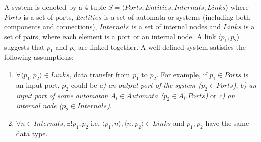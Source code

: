 A system is denoted by a 4-tuple
$S=\langle Ports, Entities, Internals, Links\rangle$ where $Ports$ is a set of ports, $Entities$ is a set of automata or systems (including both components and connections), $Internals$ is a set of internal nodes and $Links$ is a set of pairs, where each element is a port or an internal node. A link $\langle p_1,p_2\rangle$ suggests that $p_1$ and $p_2$ are linked together. A well-defined system satisfies the following assumptions:

\begin{enumerate}
    \item $\forall \langle p_1,p_2\rangle \in Links$, data transfer from $p_1$ to $p_2$. For example, if $p_1\in Ports$ is an input port, $p_2$ could be \emph{a) an output port of the system ($p_2\in Ports$)}, \emph{b) an input port of some automaton $A_i\in Automata$ ($p_2\in A_i.Ports$)} or \emph{c) an internal node ($p_2\in Internals$)}.
    \item $\forall n\in Internals,\exists!p_1,p_2$ i.e. $\langle p_1,n\rangle ,\langle n,p_2\rangle\in Links$ and $p_1,p_2$ have the same data type.
\end{enumerate}

\label{subsec:functions}
